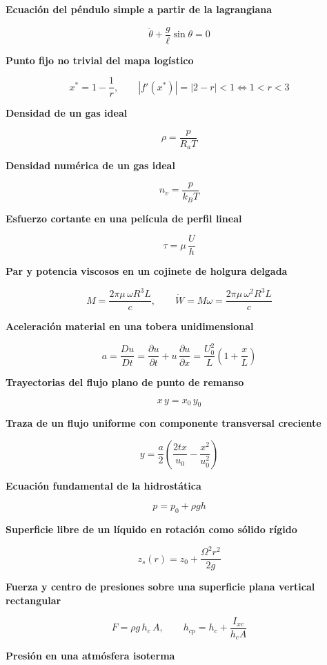 \documentclass[10pt,openany]{book}
\begin{document}
\noindent\textbf{Ecuación del péndulo simple a partir de la lagrangiana}

\[
\ddot{\theta} + \frac{g}{\ell}\sin\theta = 0
\]

\noindent\textbf{Punto fijo no trivial del mapa logístico}

\[
x^{*} = 1 - \frac{1}{r},\qquad \left|f'(x^{*})\right| = |2 - r| < 1 \iff 1 < r < 3
\]

\noindent\textbf{Densidad de un gas ideal}

\[
\rho = \frac{p}{R_a T}
\]

\noindent\textbf{Densidad numérica de un gas ideal}

\[
n_v = \frac{p}{k_B T}
\]

\noindent\textbf{Esfuerzo cortante en una película de perfil lineal}

\[
\tau = \mu\,\frac{U}{h}
\]

\noindent\textbf{Par y potencia viscosos en un cojinete de holgura delgada}

\[
M = \frac{2\pi\mu\,\omega R^{3} L}{c},\qquad \dot W = M\omega = \frac{2\pi\mu\,\omega^{2} R^{3} L}{c}
\]

\noindent\textbf{Aceleración material en una tobera unidimensional}

\[
a = \frac{Du}{Dt} = \frac{\partial u}{\partial t} + u\,\frac{\partial u}{\partial x} = \frac{U_0^{2}}{L}\left(1 + \frac{x}{L}\right)
\]

\noindent\textbf{Trayectorias del flujo plano de punto de remanso}

\[
x\,y = x_0\,y_0
\]

\noindent\textbf{Traza de un flujo uniforme con componente transversal creciente}

\[
y = \frac{a}{2}\left(\frac{2 t x}{u_0} - \frac{x^{2}}{u_0^{2}}\right)
\]

\noindent\textbf{Ecuación fundamental de la hidrostática}

\[
p = p_0 + \rho g h
\]

\noindent\textbf{Superficie libre de un líquido en rotación como sólido rígido}

\[
z_s(r) = z_0 + \frac{\Omega^{2} r^{2}}{2g}
\]

\noindent\textbf{Fuerza y centro de presiones sobre una superficie plana vertical rectangular}

\[
F = \rho g\,h_c\,A,\qquad h_{cp} = h_c + \frac{I_{xc}}{h_c A}
\]

\noindent\textbf{Presión en una atmósfera isoterma}
\end{document}
